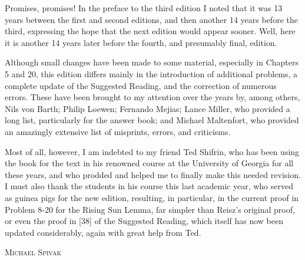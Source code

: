 Promises, promises! In the preface to the third edition I noted that it was 13
years between the first and second editions, and then another 14 years before
the third, expressing the hope that the next edition would appear sooner.
Well, here it is another 14 years later before the fourth, and presumably
final, edition.

Although small changes have been made to some material, especially in Chapters
5 and 20, this edition differs mainly in the introduction of additional
problems, a complete update of the Suggested Reading, and the correction of
numerous errors. These have been brought to my attention over the years by,
among others, Nils von Barth; Philip Loewen; Fernando Mejias; Lance Miller,
who provided a long list, particularly for the answer book; and Michael
Maltenfort, who provided an amazingly extensive list of misprints, errors, and
criticisms.

Most of all, however, I am indebted to my friend Ted Shifrin, who has been
using the book for the text in his renowned course at the University of
Georgia for all these years, and who prodded and helped me to finally make
this needed revision. I must also thank the students in his course this last
academic year, who served as guinea pigs for the new edition, resulting, in
particular, in the current proof in Problem 8-20 for the Rising Sun Lemma,
far simpler than Reisz's original proof, or even the proof in [38] of the
Suggested Reading, which itself has now been updated considerably, again with
great help from Ted.

\begin{flushright}
  \begin{minipage}{0.4\textwidth}
    \vspace{2em}
    \scshape Michael Spivak
  \end{minipage}
\end{flushright}

\clearpage

